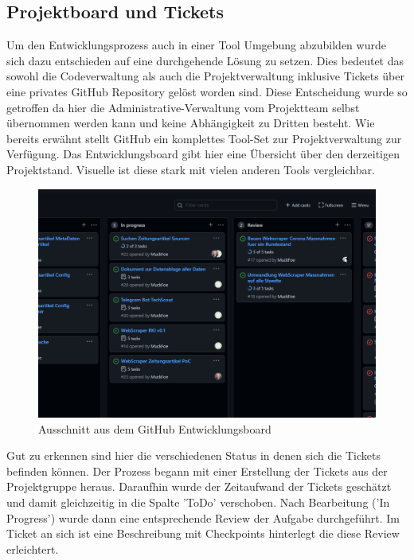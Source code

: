 \documentclass[12pt,oneside,a4paper,parskip]{scrbook}
\begin{document}
\subsection{Projektboard und Tickets}
Um den Entwicklungsprozess auch in einer Tool Umgebung abzubilden wurde sich dazu entschieden auf eine durchgehende L\"osung zu setzen. Dies bedeutet das sowohl die Codeverwaltung als auch die Projektverwaltung inklusive Tickets \"uber eine privates GitHub Repository gel\"ost worden sind. Diese Entscheidung wurde so getroffen da hier die Administrative-Verwaltung vom Projektteam selbst \"ubernommen werden kann und keine Abh\"angigkeit zu Dritten besteht. \newline
Wie bereits erw\"ahnt stellt GitHub ein komplettes Tool-Set zur Projektverwaltung zur Verf\"ugung. Das Entwicklungsboard gibt hier eine \"Ubersicht
\"uber den derzeitigen Projektstand. Visuelle ist diese stark mit vielen anderen Tools vergleichbar.
\begin{figure}[H]
	\caption{Ausschnitt aus dem GitHub Entwicklungsboard}
	\label{gitHubBoasrd}
	\centering
	\includegraphics[scale=0.35]{pictures/gitHubBoard.png}
\end{figure}
Gut zu erkennen sind hier die verschiedenen Status in denen sich die Tickets befinden k\"onnen. \newline
Der Prozess begann mit einer Erstellung der Tickets aus der Projektgruppe heraus. Daraufhin wurde der Zeitaufwand der Tickets gesch\"atzt und damit gleichzeitig in die Spalte 'ToDo' verschoben. Nach Bearbeitung ('In Progress') wurde dann eine entsprechende Review der Aufgabe durchgef\"uhrt. Im Ticket an sich ist eine Beschreibung mit Checkpoints hinterlegt die diese Review erleichtert.
\end{document}
